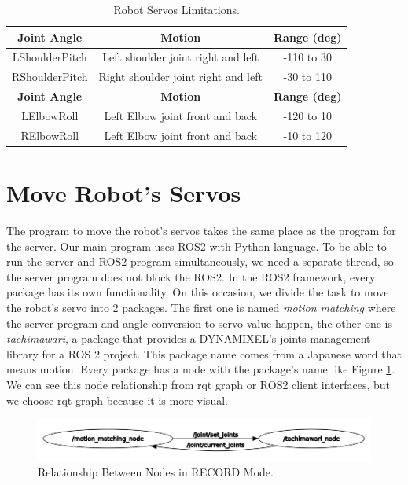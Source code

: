 \begin{longtable}{ccc}
  \caption{Robot Servos Limitations.}
  \label{tb:robot-servos}\\
  \hline
  \rowcolor[HTML]{C0C0C0}
  \textbf{Joint Angle} & \textbf{Motion} & \textbf{Range (deg)} \\
  \hline
  LShoulderPitch       & Left shoulder joint right and left    & -110 to 30  \\
  RShoulderPitch       & Right shoulder joint right and left   & -30 to 110 \\
  \rowcolor[HTML]{C0C0C0}
  \textbf{Joint Angle} & \textbf{Motion} & \textbf{Range (deg)} \\
  \hline
  LElbowRoll           & Left Elbow joint front and back       & -120 to 10  \\
  RElbowRoll           & Left Elbow joint front and back       & -10 to 120  \\
  \hline
\end{longtable}


\section{Move Robot's Servos}
\label{sec:move-robot-servo}

The program to move the robot's servos takes the same place as the program for the server. Our main program uses ROS2 with Python language. To be able to run the server and ROS2 program simultaneously, we need a separate thread, so the server program does not block the ROS2.
In the ROS2 framework, every package has its own functionality. On this occasion, we divide the task to move the robot's servo into 2 packages. The first one is named \emph{motion matching} where the server program and angle conversion to servo value happen, the other one is \emph{tachimawari},
a package that provides a DYNAMIXEL's joints management library for a ROS 2 project. This package name comes from a Japanese word that means motion. Every package has a node with the package's name like Figure \ref{fig:relation-node-record-mode}.
We can see this node relationship from rqt graph or ROS2 client interfaces, but we choose rqt graph because it is more visual.
\begin{figure}[ht]
  \centering
  \includegraphics[scale=0.62]{gambar/rqt_without_akushon.png}
  \caption{Relationship Between Nodes in RECORD Mode.}
  \label{fig:relation-node-record-mode}
\end{figure}

